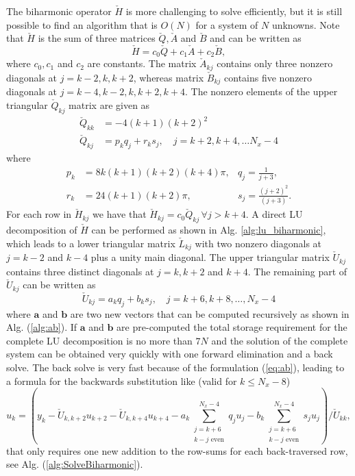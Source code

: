 \documentclass[11pt, oneside]{article}
\newcommand{\N}[1]{\check{#1}}
\begin{document}
The biharmonic operator $\N{H}$ is more challenging to solve efficiently, but 
it is still possible to find an algorithm that is $O(N)$ for a system of $N$ 
unknowns. Note 
that $\N{H}$ is the sum of three matrices $\N{Q}, \N{A}$ and $\N{B}$ and can be 
written as
\begin{equation}
\N{H} = c_0\N{Q} + c_1\N{A} + c_2 \N{B},
\end{equation}
where $c_0, c_1$ and $c_2$ are constants. The matrix $\N{A}_{kj}$ contains only 
three nonzero diagonals at $ j = k-2, k, k+2$,  whereas matrix $\N{B}_{kj}$ 
contains five 
nonzero diagonals at $ j = k-4, k-2, k, k+2, k+4$. The nonzero elements of the 
upper triangular $\N{Q}_{kj}$ matrix are given as
\begin{align}
 \N{Q}_{kk} &= -4(k+1)(k+2)^2 \\
 \N{Q}_{kj} &= p_kq_j + r_ks_j, \quad j = k+2, k+4, \ldots N_x-4
\end{align}
where 
\begin{align}
p_k &= 8 k (k+1)(k+2)(k+4)\pi, &q_j = \frac{1}{j+3}, \label{eq:pk} \\
r_k &= 24(k+1)(k+2)\pi, &s_j =  \frac{(j+2)^2}{(j+3)}. \label{eq:rk}
\end{align} 
For each row in $\N{H}_{kj}$ we have that $\N{H}_{kj}=c_0\N{Q}_{kj}\, \forall j 
> k+4$. A direct LU decomposition of $\N{H}$ can be performed as shown in Alg. 
\ref{alg:lu_biharmonic}, which leads to a lower triangular 
matrix $\N{L}_{kj}$ with two nonzero diagonals at $j=k-2$ and $k-4$ plus a 
unity 
main diagonal. The upper triangular matrix $\N{U}_{kj}$ contains three distinct 
diagonals at $j=k, k+2$ and $k+4$. The remaining part of $\N{U}_{kj}$ can be 
written as
\begin{equation}
\N{U}_{kj} = a_k q_j + b_k s_j, \quad j = k+6, k+8, \ldots, N_x-4 \label{eq:ab}
\end{equation}
where $\bm{a}$ and $\bm{b}$ are two new vectors that can be computed 
recursively as shown in Alg. (\ref{alg:ab}). If $\bm{a}$ and $\bm{b}$ are 
pre-computed 
the total storage requirement for the complete LU decomposition is no more than 
$7N$ and the solution of the complete system can be obtained very quickly with 
one forward elimination and a back solve. The back 
solve is very fast because of the formulation (\ref{eq:ab}), leading 
to a formula for the backwards substitution like (valid for $k \le N_x-8$)
\begin{equation}
u_k = \left(y_k - \N{U}_{k, k+2} u_{k+2} - \N{U}_{k, k+4} u_{k+4} - 
a_k\sum_{\substack{j=k+6\\k-j \text{ even}}}^{N_x-4} q_j u_j - 
b_k\sum_{\substack{j=k+6\\k-j \text{ even}}}^{N_x-4} 
s_j u_j\right)/\N{U}_{kk},
\end{equation}
that only requires 
one new addition to the row-sums for each back-traversed
row, see Alg. (\ref{alg:SolveBiharmonic}).
\end{document}
